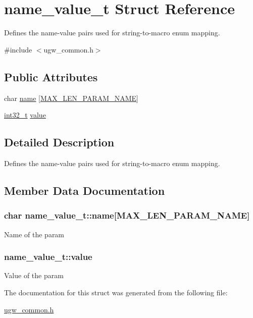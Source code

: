 \hypertarget{structname__value__t}{\section{name\-\_\-value\-\_\-t Struct Reference}
\label{structname__value__t}
}


Defines the name-\/value pairs used for string-\/to-\/macro enum mapping.  




{\ttfamily \#include $<$ugw\-\_\-common.\-h$>$}

\subsection*{Public Attributes}
\begin{DoxyCompactItemize}
\item 
char \hyperlink{structname__value__t_a44c775e34e1e8a5a0d6423c67d5e3a1d}{name} \mbox{[}\hyperlink{group__LIBHELP_gaac5d922b6e3eb48b7ba829979fd73ae2}{M\-A\-X\-\_\-\-L\-E\-N\-\_\-\-P\-A\-R\-A\-M\-\_\-\-N\-A\-M\-E}\mbox{]}
\item 
\hyperlink{commondefs_8h_a32f2e37ee053cf2ce8ca28d1f74630e5}{int32\-\_\-t} \hyperlink{structname__value__t_a6cc6005c6235e34827f015d95783d249}{value}
\end{DoxyCompactItemize}


\subsection{Detailed Description}
Defines the name-\/value pairs used for string-\/to-\/macro enum mapping. 

\subsection{Member Data Documentation}
\hypertarget{structname__value__t_a44c775e34e1e8a5a0d6423c67d5e3a1d}{
\subsubsection[{name}]{\setlength{\rightskip}{0pt plus 5cm}char name\-\_\-value\-\_\-t\-::name\mbox{[}{\bf M\-A\-X\-\_\-\-L\-E\-N\-\_\-\-P\-A\-R\-A\-M\-\_\-\-N\-A\-M\-E}\mbox{]}}}\label{structname__value__t_a44c775e34e1e8a5a0d6423c67d5e3a1d}
Name of the param \hypertarget{structname__value__t_a6cc6005c6235e34827f015d95783d249}{
\subsubsection[{value}]{ name\-\_\-value\-\_\-t\-::value}}\label{structname__value__t_a6cc6005c6235e34827f015d95783d249}
Value of the param 

The documentation for this struct was generated from the following file\-:\begin{DoxyCompactItemize}
\item 
\hyperlink{ugw__common_8h}{ugw\-\_\-common.\-h}\end{DoxyCompactItemize}
